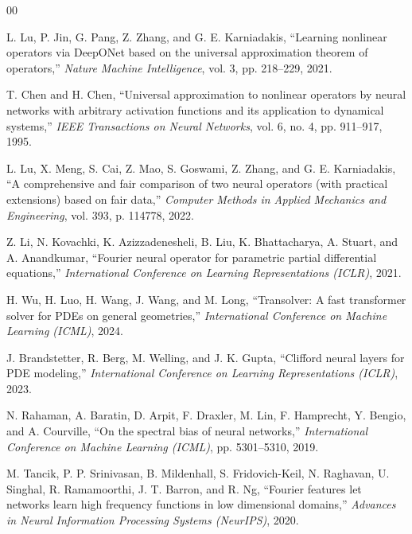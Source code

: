 \documentclass[conference]{IEEEtran}
\begin{document}
\begin{thebibliography}{00}

L. Lu, P. Jin, G. Pang, Z. Zhang, and G. E. Karniadakis,
``Learning nonlinear operators via DeepONet based on the universal approximation theorem of operators,''
\textit{Nature Machine Intelligence}, vol. 3, pp. 218--229, 2021.

T. Chen and H. Chen,
``Universal approximation to nonlinear operators by neural networks with arbitrary activation functions and its application to dynamical systems,''
\textit{IEEE Transactions on Neural Networks}, vol. 6, no. 4, pp. 911--917, 1995.

L. Lu, X. Meng, S. Cai, Z. Mao, S. Goswami, Z. Zhang, and G. E. Karniadakis,
``A comprehensive and fair comparison of two neural operators (with practical extensions) based on fair data,''
\textit{Computer Methods in Applied Mechanics and Engineering}, vol. 393, p. 114778, 2022.

Z. Li, N. Kovachki, K. Azizzadenesheli, B. Liu, K. Bhattacharya, A. Stuart, and A. Anandkumar,
``Fourier neural operator for parametric partial differential equations,''
\textit{International Conference on Learning Representations (ICLR)}, 2021.

H. Wu, H. Luo, H. Wang, J. Wang, and M. Long,
``Transolver: A fast transformer solver for PDEs on general geometries,''
\textit{International Conference on Machine Learning (ICML)}, 2024.

J. Brandstetter, R. Berg, M. Welling, and J. K. Gupta,
``Clifford neural layers for PDE modeling,''
\textit{International Conference on Learning Representations (ICLR)}, 2023.

N. Rahaman, A. Baratin, D. Arpit, F. Draxler, M. Lin, F. Hamprecht, Y. Bengio, and A. Courville,
``On the spectral bias of neural networks,''
\textit{International Conference on Machine Learning (ICML)}, pp. 5301--5310, 2019.

M. Tancik, P. P. Srinivasan, B. Mildenhall, S. Fridovich-Keil, N. Raghavan, U. Singhal, R. Ramamoorthi, J. T. Barron, and R. Ng,
``Fourier features let networks learn high frequency functions in low dimensional domains,''
\textit{Advances in Neural Information Processing Systems (NeurIPS)}, 2020.


\end{thebibliography}
\end{document}
